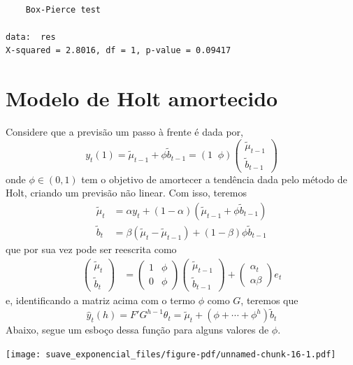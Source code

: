 \documentclass[
  letterpaper,
  DIV=11,
  numbers=noendperiod]{scrreprt}
\theoremstyle{definition}
\theoremstyle{plain}
\theoremstyle{definition}
\theoremstyle{plain}
\theoremstyle{remark}
\begin{document}
\begin{verbatim}

    Box-Pierce test

data:  res
X-squared = 2.8016, df = 1, p-value = 0.09417
\end{verbatim}

\hypertarget{modelo-de-holt-amortecido}{%
\section{Modelo de Holt amortecido}\label{modelo-de-holt-amortecido}}

Considere que a previsão um passo à frente é dada por,
\[y_{t}(1)=\tilde{\mu}_{t-1}+\phi\tilde{b}_{t-1}=(1\;\;\phi)\left(\begin{array}{c}\tilde{\mu}_{t-1}\\ \tilde{b}_{t-1}\end{array}\right)\]
onde \(\phi\in(0,1)\) tem o objetivo de amortecer a tendência dada pelo
método de Holt, criando um previsão não linear. Com isso, teremos
\[\begin{align}
\tilde{\mu}_t &= \alpha y_t + (1-\alpha)(\tilde{\mu}_{t-1} + \phi\tilde{b}_{t-1})\\
\tilde{b}_t &= \beta(\tilde{\mu}_{t} - \tilde{\mu}_{t-1})+(1-\beta) \phi\tilde{b}_{t-1}
\end{align}\] que por sua vez pode ser reescrita como \[\begin{align}
\left(\begin{array}{c}\tilde{\mu}_t\\ \tilde{b}_t\end{array}\right) &= \left(\begin{array}{cc}1&\phi\\ 0 &\phi\end{array}\right)\left(\begin{array}{c}\tilde{\mu}_{t-1}\\ \tilde{b}_{t-1}\end{array}\right)+\left(\begin{array}{c}\alpha_t\\ \alpha\beta\end{array}\right)e_t\end{align}\]
e, identificando a matriz acima com o termo \(\phi\) como \(G\), teremos
que
\[\hat{y}_{t}(h)=F'G^{h-1}\theta_{t}=\tilde{\mu}_t+(\phi+\cdots+\phi^h)\tilde{b}_t\]
Abaixo, segue um esboço dessa função para alguns valores de \(\phi.\)

\texttt{[image: suave\_exponencial\_files/figure-pdf/unnamed-chunk-16-1.pdf]}
\end{document}
